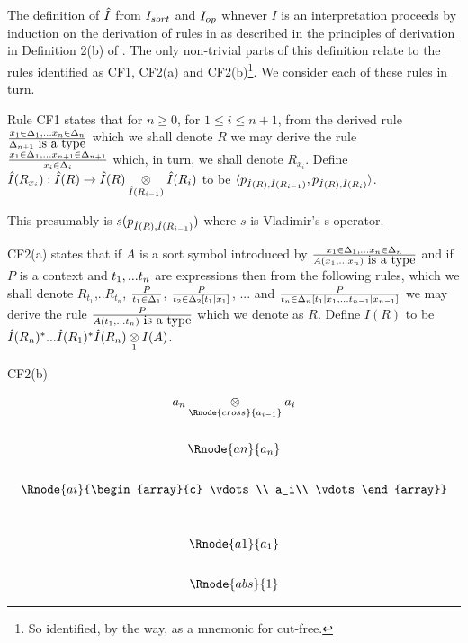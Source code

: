 \note The definition of $\Ihat$ from $\Isort$ and $\Iop$ whnever $I$ is an interpretation proceeds by induction 
on the derivation of rules in  \gatUw 
as described in the principles of derivation in Definition 2(b) of \cite{Cartmell86}. 
The only non-trivial parts of this definition relate to the rules
identified as CF1, CF2(a) and CF2(b)\footnote{So identified, by the way, as a mnemonic for cut-free.}. We consider each of these rules in turn.

\begin{point}
Rule CF1 states that for $n \geq 0$, for $1 \leq i \leq n+1$, from the derived rule 
$\frac{\xDelta{n}}{\isT{\Delta_{n+1}}}$ which we shall denote $R$ 
we may derive the rule
$\frac{\xDelta{n+1}}{\ofT{x_i}{\Delta_i}}$ which, in turn, we shall denote $R_{x_i}$.
Define $\Ihat(R_{x_i}) :  \Ihat(R) \morph \crossx{\Ihat(R)}{\Ihat(R_i)}{\Ihat(R_{i-1})}$
to be $\tuple{p_{\Ihat(R),\Ihat(R_{i-1})},p_{\Ihat(R),\Ihat(R_{i})}}$. 

This presumably is $s(p_{\Ihat(R),\Ihat(R_{i-1})})$ where $s$ is Vladimir's s-operator.
\end{point}
\begin{point}
CF2(a) states that if $A$ is a sort symbol introduced by
$\frac{\xDelta{n}}{\isT{A(\xn)}}$ 
and if $P$ is a context and $\tn$ are expressions then from the following rules, which we shall denote $R_{t_1}$,..$R_{t_n}$,
$\frac{P}{\ofT{t_1}{\Delta_1}}$,
$\frac{P}{\ofT{t_2}{\Delta_2[t_1|x_1]}}$,
... and 
$\frac{P}{\ofT{t_n}{\Delta_n[t_1|x_1,...t_{n-1}|x_{n-1}]}}$
we may derive the rule
$\frac{P}{\isT{A(t_1,...t_n)}}$ which we denote as $R$. 
Define $I(R)$ to be $\Ihat(R_n)^*...\Ihat(R_1)^*\crossx{\Ihat(R_n)}{I(A)}{1}$.
\end{point}
\begin{point}
CF2(b) 
\end{point}

\begin{oldtt}
\begin{displaymath}
\begin{array}{c}
\crossx{a_n}{a_i}{\Rnode{cross}{a_{i-1}}} \\[0.9cm]
\Rnode{an}{a_n}\\[0.7cm]
\Rnode{ai}{\begin{array}{c}
\vdots\\
a_i\\
\vdots
\end{array}} \\[1.1cm]
\Rnode{a1}{a_1}\\[0.7cm]
\Rnode{abs}{1}
\end{array}
\end{displaymath}
\end{oldtt}
